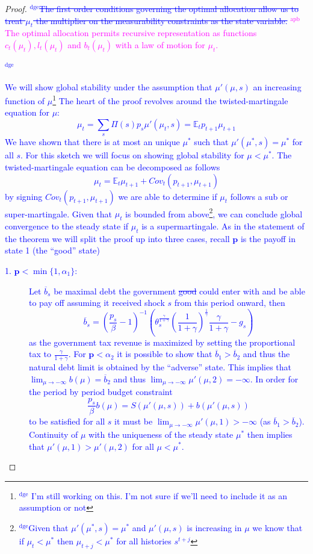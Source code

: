 \documentclass[12pt]{article}
\newcommand{\dge}[1]{\textcolor{blue}{$^{\textrm{dge}}${#1}}}
\newcommand{\apb}[1]{\textcolor{magenta}{$^{\textrm{apb}}${#1}}}
\newcommand{\EE}{\mathbb E}
\begin{document}
\begin{proof}\dge{\st{The first order conditions governing the optimal allocation allow us to treat $\mu_t$ the multiplier on the measurability constraints as the state variable. }}
\apb{The optimal allocation permits recursive representation as functions $c_t(\mu_t),l_t(\mu_t)$ and $b_t(\mu_t)$ with a law of motion for $\mu_{t}$.}
\dge{
We will show global stability under the assumption that $\mu'(\mu,s)$ an increasing function of $\mu$\footnote{\dge{ I'm still working on this.  I'm not sure if we'll need to include it as an assumption or not}}  The heart of the proof revolves around the twisted-martingale equation for $\mu$:
\[
	\mu_t = \sum_s \Pi(s) p_s \mu'(\mu_t,s) = \EE_t p_{t+1}\mu_{t+1}
\]  We have shown that there is at most an unique $\mu^*$ such that $\mu'(\mu^*,s) = \mu^*$ for all $s$.  For this sketch we will focus on showing global stability for $\mu < \mu^*$. The twisted-martingale equation can be decomposed as follows
\[ 
	\mu_t = \EE_t \mu_{t+1}+Cov_t(p_{t+1},\mu_{t+1})
\] by signing $Cov_t(p_{t+1},\mu_{t+1})$ we are able to determine if $\mu_t$ follows a sub or super-martingale.  Given that $\mu_t$ is bounded from above\footnote{\dge{Given that $\mu'(\mu^*,s) = \mu^*$ and $\mu'(\mu,s)$ is increasing in $\mu$  we know that if $\mu_t < \mu^*$ then $\mu_{t+j} < \mu^*$ for all histories $s^{t+j}$}}, we can conclude global convergence to the steady state if $\mu_t$ is a supermartingale.  As in the statement of the theorem we will split the proof up into three cases, recall $\bm p$ is the payoff in state 1 (the ``good'' state)
\begin{description}
	\item[1. $\bm p < \min\{1,\alpha_1\}$:]  Let $\overline b_s$ be maximal debt the government \st{good} could enter with and be able to pay off assuming it received shock $s$ from this period onward, then
	\[
	\overline b_s = \left(\frac{p_s}{\beta}-1\right)^{-1}\left(\theta_s^\frac{\gamma}{1+\gamma}\left(\frac1{1+\gamma}\right)^\frac1\gamma\frac\gamma{1+\gamma}-g_s\right)
	\]as the government tax revenue is maximized by setting the proportional tax to $\frac\gamma{1+\gamma}$.  For $\bm p <\alpha_2$ it is possible to show that $\overline b_1 > \overline b_2$ and thus the natural debt limit is obtained by the ``adverse'' state.  This implies that $\lim_{\mu\rightarrow-\infty} b(\mu) = \overline b_2$ and thus $\lim_{\mu\rightarrow-\infty} \mu'(\mu,2) = -\infty$.  In order for the period by period budget constraint
	\[
		\frac{p_s}{\beta}b(\mu) = S(\mu'(\mu,s))+b(\mu'(\mu,s))
	\]to be satisfied for all $s$ it must be $\lim_{\mu\rightarrow -\infty} \mu'(\mu,1) >-\infty$ (as $\overline b_1 > \overline b_2$).  Continuity of $\mu$ with the uniqueness of the steady state $\mu^*$ then implies that $\mu'(\mu,1) > \mu'(\mu,2)$ for all $\mu < \mu^*$.

\end{description}}
\end{proof}
\end{document}
